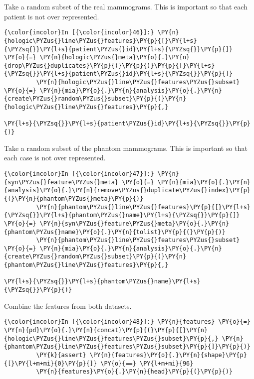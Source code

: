     Take a random subset of the real mammograms. This is important so that
each patient is not over represented.

    \begin{Verbatim}[commandchars=\\\{\}]
{\color{incolor}In [{\color{incolor}46}]:} \PY{n}{hologic\PYZus{}line\PYZus{}features}\PY{p}{[}\PY{l+s}{\PYZsq{}}\PY{l+s}{patient\PYZus{}id}\PY{l+s}{\PYZsq{}}\PY{p}{]} \PY{o}{=} \PY{n}{hologic\PYZus{}meta}\PY{o}{.}\PY{n}{drop\PYZus{}duplicates}\PY{p}{(}\PY{p}{)}\PY{p}{[}\PY{l+s}{\PYZsq{}}\PY{l+s}{patient\PYZus{}id}\PY{l+s}{\PYZsq{}}\PY{p}{]}
         \PY{n}{hologic\PYZus{}line\PYZus{}features\PYZus{}subset} \PY{o}{=} \PY{n}{mia}\PY{o}{.}\PY{n}{analysis}\PY{o}{.}\PY{n}{create\PYZus{}random\PYZus{}subset}\PY{p}{(}\PY{n}{hologic\PYZus{}line\PYZus{}features}\PY{p}{,}
                                                                          \PY{l+s}{\PYZsq{}}\PY{l+s}{patient\PYZus{}id}\PY{l+s}{\PYZsq{}}\PY{p}{)}
\end{Verbatim}

    Take a random subset of the phantom mammograms. This is important so
that each case is not over represented.

    \begin{Verbatim}[commandchars=\\\{\}]
{\color{incolor}In [{\color{incolor}47}]:} \PY{n}{syn\PYZus{}feature\PYZus{}meta} \PY{o}{=} \PY{n}{mia}\PY{o}{.}\PY{n}{analysis}\PY{o}{.}\PY{n}{remove\PYZus{}duplicate\PYZus{}index}\PY{p}{(}\PY{n}{phantom\PYZus{}meta}\PY{p}{)}
         \PY{n}{phantom\PYZus{}line\PYZus{}features}\PY{p}{[}\PY{l+s}{\PYZsq{}}\PY{l+s}{phantom\PYZus{}name}\PY{l+s}{\PYZsq{}}\PY{p}{]} \PY{o}{=} \PY{n}{syn\PYZus{}feature\PYZus{}meta}\PY{o}{.}\PY{n}{phantom\PYZus{}name}\PY{o}{.}\PY{n}{tolist}\PY{p}{(}\PY{p}{)}
         \PY{n}{phantom\PYZus{}line\PYZus{}features\PYZus{}subset} \PY{o}{=} \PY{n}{mia}\PY{o}{.}\PY{n}{analysis}\PY{o}{.}\PY{n}{create\PYZus{}random\PYZus{}subset}\PY{p}{(}\PY{n}{phantom\PYZus{}line\PYZus{}features}\PY{p}{,}
                                                                          \PY{l+s}{\PYZsq{}}\PY{l+s}{phantom\PYZus{}name}\PY{l+s}{\PYZsq{}}\PY{p}{)}
\end{Verbatim}

    Combine the features from both datasets.

    \begin{Verbatim}[commandchars=\\\{\}]
{\color{incolor}In [{\color{incolor}48}]:} \PY{n}{features} \PY{o}{=} \PY{n}{pd}\PY{o}{.}\PY{n}{concat}\PY{p}{(}\PY{p}{[}\PY{n}{hologic\PYZus{}line\PYZus{}features\PYZus{}subset}\PY{p}{,} \PY{n}{phantom\PYZus{}line\PYZus{}features\PYZus{}subset}\PY{p}{]}\PY{p}{)}
         \PY{k}{assert} \PY{n}{features}\PY{o}{.}\PY{n}{shape}\PY{p}{[}\PY{l+m+mi}{0}\PY{p}{]} \PY{o}{==} \PY{l+m+mi}{96}
         \PY{n}{features}\PY{o}{.}\PY{n}{head}\PY{p}{(}\PY{p}{)}
\end{Verbatim}

